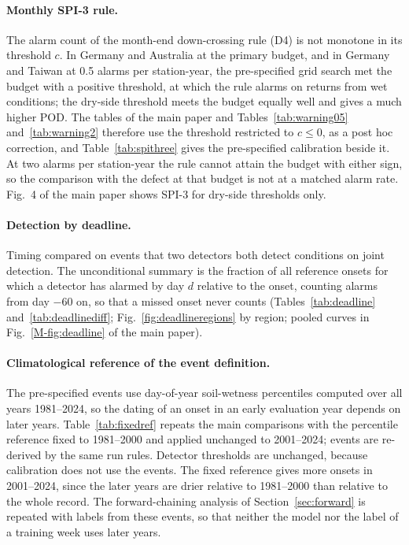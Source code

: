 \documentclass[pdflatex,sn-mathphys-ay]{sn-jnl}
\begin{document}
\paragraph{Monthly SPI-3 rule.} The alarm count of the month-end down-crossing rule (D4) is not monotone
in its threshold $c$. In Germany and Australia at the primary budget, and in Germany and Taiwan at 0.5
alarms per station-year, the pre-specified grid search met the budget with a positive threshold, at which
the rule alarms on returns from wet conditions; the dry-side threshold meets the budget equally well and
gives a much higher POD. The tables of the main paper and Tables~\ref{tab:warning05}
and~\ref{tab:warning2} therefore use the threshold restricted to $c\le0$, as a post hoc correction, and
Table~\ref{tab:spithree} gives the pre-specified calibration beside it. At two alarms per station-year
the rule cannot attain the budget with either sign, so the comparison with the defect at that budget is
not at a matched alarm rate. Fig.~4 of the main paper shows SPI-3 for dry-side thresholds only.

\paragraph{Detection by deadline.} Timing compared on events that two detectors both detect conditions on
joint detection. The unconditional summary is the fraction of all reference onsets for which a detector
has alarmed by day $d$ relative to the onset, counting alarms from day $-60$ on, so that a missed onset
never counts (Tables~\ref{tab:deadline} and~\ref{tab:deadlinediff}; Fig.~\ref{fig:deadlineregions} by
region; pooled curves in Fig.~\ref{M-fig:deadline} of the main paper).

\paragraph{Climatological reference of the event definition.} The pre-specified events use day-of-year
soil-wetness percentiles computed over all years 1981--2024, so the dating of an onset in an early
evaluation year depends on later years. Table~\ref{tab:fixedref} repeats the main comparisons with the
percentile reference fixed to 1981--2000 and applied unchanged to 2001--2024; events are re-derived by the
same run rules. Detector thresholds are unchanged, because calibration does not use the events. The fixed
reference gives more onsets in 2001--2024, since the later years are drier relative to 1981--2000 than
relative to the whole record. The forward-chaining analysis of Section~\ref{sec:forward} is repeated
with labels from these events, so that neither the model nor the label of a training week uses later
years.
\end{document}
